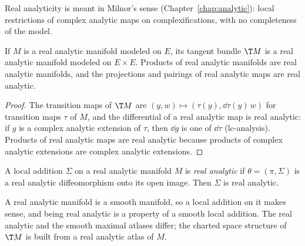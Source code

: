 Real analyticity is meant in Milnor's sense (Chapter~\ref{chap:analytic}): local restrictions of
complex analytic maps on complexifications, with no completeness of the model.

\begin{proposition}
  \label{prop:analytic-bundle}
  \leanok
  If $M$ is a real analytic manifold modeled on $E$, its tangent bundle $\T M$ is a real analytic
  manifold modeled on $E \times E$. Products of real analytic manifolds are real analytic
  manifolds, and the projections and pairings of real analytic maps are real analytic.
\end{proposition}

\begin{proof}
  \leanok
  The transition maps of $\T M$ are $(y, w) \mapsto (\tau(y), \dd\tau(y)\, w)$ for transition maps
  $\tau$ of $M$, and the differential of a real analytic map is real analytic: if $g$ is a complex
  analytic extension of $\tau$, then $\dd g$ is one of $\dd\tau$ (lc-analysis). Products of real
  analytic maps are real analytic because products of complex analytic extensions are complex
  analytic extensions.
\end{proof}

\begin{definition}
  \label{def:analytic-local-addition}
  \leanok
  A local addition $\Sigma$ on a real analytic manifold $M$ is \emph{real analytic} if
  $\theta = (\pi, \Sigma)$ is a real analytic diffeomorphism onto its open image. Then $\Sigma$ is
  real analytic.
\end{definition}

A real analytic manifold is a smooth manifold, so a local addition on it makes sense, and being
real analytic is a property of a smooth local addition. The real analytic and the smooth maximal
atlases differ; the charted space structure of $\T M$ is built from a real analytic atlas of $M$.

